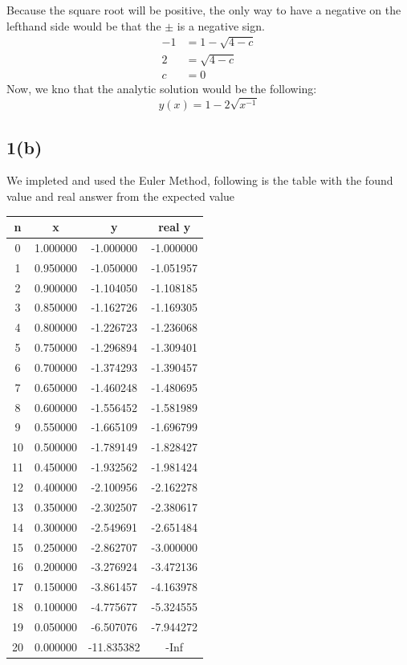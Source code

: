 \documentclass{article}
\begin{document}
Because the square root will be positive, the only way to have a negative on the lefthand side would be that the $\pm$ is a negative sign.
\begin{equation*}
\begin{aligned}
-1 &= 1 - \sqrt{4 - c}\\
2 &= \sqrt{4 - c}\\
c & = 0 
\end{aligned}
\end{equation*}
Now, we kno that the analytic solution would be the following:
\begin{equation*}
y(x) = 1 - 2 \sqrt{x^{-1}}
\end{equation*}
\subsection*{1(b)}
We impleted and used the Euler Method, following is the table with the found value and real answer from the expected value\\
\begin{center}
\begin{tabular}{|c|c|c|c|}
\hline
n & x & y & real y \\ \hline
0 & 1.000000 & -1.000000 & -1.000000 \\ \hline 
1 & 0.950000 & -1.050000 & -1.051957 \\ \hline 
2 & 0.900000 & -1.104050 & -1.108185 \\ \hline 
3 & 0.850000 & -1.162726 & -1.169305 \\ \hline 
4 & 0.800000 & -1.226723 & -1.236068 \\ \hline 
5 & 0.750000 & -1.296894 & -1.309401 \\ \hline 
6 & 0.700000 & -1.374293 & -1.390457 \\ \hline 
7 & 0.650000 & -1.460248 & -1.480695 \\ \hline 
8 & 0.600000 & -1.556452 & -1.581989 \\ \hline 
9 & 0.550000 & -1.665109 & -1.696799 \\ \hline 
10 & 0.500000 & -1.789149 & -1.828427 \\ \hline 
11 & 0.450000 & -1.932562 & -1.981424 \\ \hline 
12 & 0.400000 & -2.100956 & -2.162278 \\ \hline 
13 & 0.350000 & -2.302507 & -2.380617 \\ \hline 
14 & 0.300000 & -2.549691 & -2.651484 \\ \hline 
15 & 0.250000 & -2.862707 & -3.000000 \\ \hline 
16 & 0.200000 & -3.276924 & -3.472136 \\ \hline 
17 & 0.150000 & -3.861457 & -4.163978 \\ \hline 
18 & 0.100000 & -4.775677 & -5.324555 \\ \hline 
19 & 0.050000 & -6.507076 & -7.944272 \\ \hline 
20 & 0.000000 & -11.835382 & -Inf \\ \hline 
\end{tabular}
\end{center}
\end{document}
